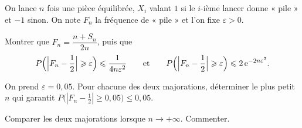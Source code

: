 \begin{exoEval}{}{}
On lance $n$ fois une pièce équilibrée, $X_i$ valant $1$ si le $i$-ième
lancer donne « pile » et $-1$ sinon. On note $F_n$ la fréquence de « pile »
et l'on fixe $\varepsilon>0$.
\begin{questions}[start=7]
  \item Montrer que $F_n=\dfrac{n+S_n}{2n}$, puis que
    \[P\Bigl(\Bigl|F_n-\frac12\Bigr|\geqslant\varepsilon\Bigr)\leqslant\frac{1}{4n\varepsilon^{2}}
      \qquad\text{et}\qquad
      P\Bigl(\Bigl|F_n-\frac12\Bigr|\geqslant\varepsilon\Bigr)\leqslant2\,\mathrm{e}^{-2n\varepsilon^{2}}.\]
  \item On prend $\varepsilon=0{,}05$. Pour chacune des deux majorations,
    déterminer le plus petit $n$ qui garantit
    $P\bigl(|F_n-\frac12|\geqslant0{,}05\bigr)\leqslant0{,}05$.
  \item Comparer les deux majorations lorsque $n\to+\infty$. Commenter.
\end{questions}
\end{exoEval}
